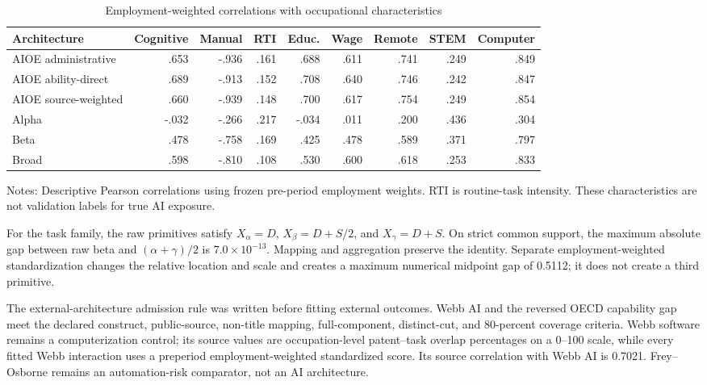 \begin{table}[htbp]
\centering
\caption{Employment-weighted correlations with occupational characteristics}
\label{tab:app-content}
\scriptsize
\setlength{\tabcolsep}{3pt}
\begin{threeparttable}
\begin{tabularx}{\textwidth}{Yrrrrrrrr}
\toprule
Architecture & Cognitive & Manual & RTI & Educ. & Wage & Remote & STEM & Computer\\
\midrule
AIOE administrative & .653 & -.936 & .161 & .688 & .611 & .741 & .249 & .849\\
AIOE ability-direct & .689 & -.913 & .152 & .708 & .640 & .746 & .242 & .847\\
AIOE source-weighted & .660 & -.939 & .148 & .700 & .617 & .754 & .249 & .854\\
Alpha & -.032 & -.266 & .217 & -.034 & .011 & .200 & .436 & .304\\
Beta & .478 & -.758 & .169 & .425 & .478 & .589 & .371 & .797\\
Broad & .598 & -.810 & .108 & .530 & .600 & .618 & .253 & .833\\
\bottomrule
\end{tabularx}
\begin{tablenotes}[flushleft]\footnotesize
\item Notes: Descriptive Pearson correlations using frozen pre-period employment weights. RTI is routine-task intensity. These characteristics are not validation labels for true AI exposure.
\end{tablenotes}
\end{threeparttable}
\end{table}
\FloatBarrier

For the task family, the raw primitives satisfy $X_\alpha=D$, $X_\beta=D+S/2$, and $X_\gamma=D+S$. On strict common support, the maximum absolute gap between raw beta and $(\alpha+\gamma)/2$ is $7.0\times10^{-13}$. Mapping and aggregation preserve the identity. Separate employment-weighted standardization changes the relative location and scale and creates a maximum numerical midpoint gap of 0.5112; it does not create a third primitive.

The external-architecture admission rule was written before fitting external outcomes. Webb AI and the reversed OECD capability gap meet the declared construct, public-source, non-title mapping, full-component, distinct-cut, and 80-percent coverage criteria. Webb software remains a computerization control; its source values are occupation-level patent--task overlap percentages on a 0--100 scale, while every fitted Webb interaction uses a preperiod employment-weighted standardized score. Its source correlation with Webb AI is 0.7021. Frey--Osborne remains an automation-risk comparator, not an AI architecture.

